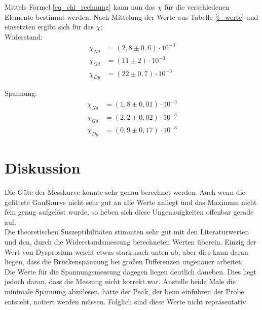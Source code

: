 Mittels Formel \eqref{eq_chi_rechnung} kann nun das $\chi$ für die verschiedenen Elemente bestimmt werden. Nach Mittelung der Werte aus Tabelle \ref{t_werte} und einsetzten ergibt sich für das $\chi$:\\

Widerstand:
\begin{align*}
\chi_{Nd}&=(2,8\pm 0,6)\cdot10^{-3}\\
\chi_{Gd}&=(11\pm 2)\cdot10^{-3}\\
\chi_{Dy}&=(22\pm 0,7)\cdot10^{-3}
\end{align*}

Spannung:
\begin{align*}
\chi_{Nd}&=(1,8\pm 0,01)\cdot10^{-3}\\
\chi_{Gd}&=(2,2\pm 0,02)\cdot10^{-3}\\
\chi_{Dy}&=(0,9\pm 0,17)\cdot10^{-3}
\end{align*}

\section{Diskussion}
Die Güte der Messkurve konnte sehr genau berechnet werden. Auch wenn die gefittete Gaußkurve nicht sehr gut an alle Werte anliegt und das Maximum nicht fein genug aufgelöst wurde, so heben sich diese Ungenauigkeiten offenbar gerade auf.\\
Die theoretischen Suszeptibilitäten stimmten sehr gut mit den Literaturwerten und den, durch die Widerstandsmessung berechneten Werten überein. Einzig der Wert von Dysprosium weicht etwas stark nach unten ab, aber dies kann daran liegen, dass die Brückenspannung bei großen Differenzen ungenauer arbeitet.\\
Die Werte für die Spannungsmessung dagegen liegen deutlich daneben. Dies liegt jedoch daran, dass die Messung nicht korrekt war. Anstelle beide Male die minimale Spannung abzulesen, hätte der Peak, der beim einführen der Probe entsteht, notiert werden müssen. Folglich sind diese Werte nicht repräsentativ.





